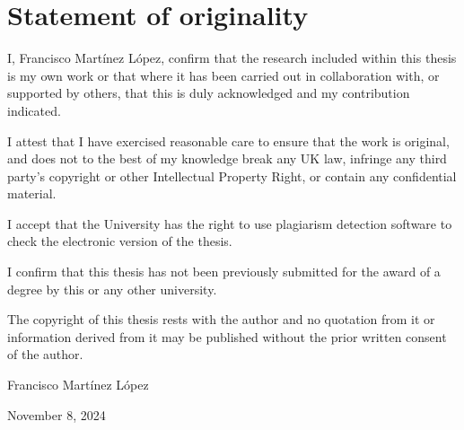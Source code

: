 \chapter*{Statement of originality}
\label{C:Statement}

I, Francisco Mart\'{i}nez L\'{o}pez, confirm that the research included
within this thesis is my own work or that where it has been carried out in collaboration with, or supported by others, that this is duly acknowledged and my contribution indicated.

\bigskip

\noindent
I attest that I have exercised reasonable care to ensure that the work is
original, and does not to the best of my knowledge break any UK law, infringe any third party's copyright or other Intellectual Property Right, or contain any confidential material.

\bigskip

\noindent
I accept that the University has the right to use plagiarism detection software to check the electronic version of the thesis.

\bigskip

\noindent
I confirm that this thesis has not been previously submitted for the award of a degree by this or any other university.

\bigskip

\noindent
The copyright of this thesis rests with the author and no quotation from it or information derived from it may be published without the prior written consent of the author.

\bigskip

\noindent
Francisco Mart\'{i}nez L\'{o}pez

\noindent
November 8, 2024

\bigskip